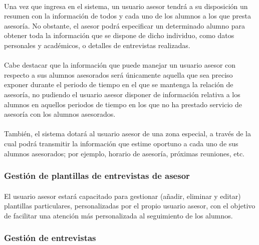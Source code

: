       \paragraph{}Una vez que ingresa en el sistema, un usuario asesor tendrá
      a su disposición un resumen con la información de todos y cada uno de los
      alumnos a los que presta asesoría. No obstante, el asesor podrá
      especificar un determinado alumno para obtener toda la información que
      se dispone de dicho individuo, como datos personales y académicos, o
      detalles de entrevistas realizadas.

      \paragraph{}Cabe destacar que la información que puede manejar un usuario
      asesor con respecto a sus alumnos asesorados será únicamente aquella
      que sea preciso exponer durante el periodo de tiempo en el que se mantenga
      la relación de asesoría, no pudiendo el usuario asesor disponer
      de información relativa a los alumnos en aquellos periodos de tiempo en
      los que no ha prestado servicio de asesoría con los alumnos asesorados.

      \paragraph{}También, el sistema dotará al usuario asesor de una
      zona especial, a través de la cual podrá transmitir la información que
      estime oportuno a cada uno de sus alumnos asesorados; por ejemplo, horario
      de asesoría, próximas reuniones, etc.

      \subsubsection{Gestión de plantillas de entrevistas de asesor}

      \paragraph{}El usuario asesor estará capacitado para gestionar
      (añadir, eliminar y editar) plantillas particulares, personalizadas
      por el propio usuario asesor, con el objetivo de facilitar una atención
      más personalizada al seguimiento de los alumnos.

      \subsubsection{Gestión de entrevistas}


